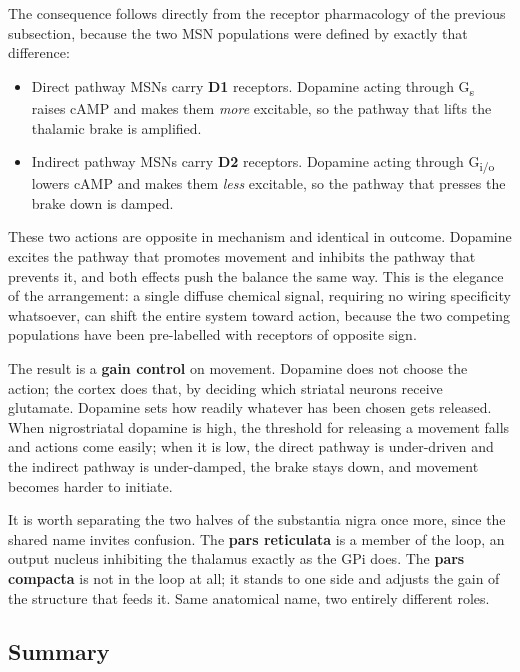 \documentclass[11pt]{article}
\begin{document}
The consequence follows directly from the receptor pharmacology of the previous subsection, because the two MSN populations were defined by exactly that difference:

\begin{itemize}
    \item Direct pathway MSNs carry \textbf{D1} receptors. Dopamine acting through G\textsubscript{s} raises cAMP and makes them \textit{more} excitable, so the pathway that lifts the thalamic brake is amplified.
    \item Indirect pathway MSNs carry \textbf{D2} receptors. Dopamine acting through G\textsubscript{i/o} lowers cAMP and makes them \textit{less} excitable, so the pathway that presses the brake down is damped.
\end{itemize}

These two actions are opposite in mechanism and identical in outcome. Dopamine excites the pathway that promotes movement and inhibits the pathway that prevents it, and both effects push the balance the same way. This is the elegance of the arrangement: a single diffuse chemical signal, requiring no wiring specificity whatsoever, can shift the entire system toward action, because the two competing populations have been pre-labelled with receptors of opposite sign.

The result is a \textbf{gain control} on movement. Dopamine does not choose the action; the cortex does that, by deciding which striatal neurons receive glutamate. Dopamine sets how readily whatever has been chosen gets released. When nigrostriatal dopamine is high, the threshold for releasing a movement falls and actions come easily; when it is low, the direct pathway is under-driven and the indirect pathway is under-damped, the brake stays down, and movement becomes harder to initiate.

It is worth separating the two halves of the substantia nigra once more, since the shared name invites confusion. The \textbf{pars reticulata} is a member of the loop, an output nucleus inhibiting the thalamus exactly as the GPi does. The \textbf{pars compacta} is not in the loop at all; it stands to one side and adjusts the gain of the structure that feeds it. Same anatomical name, two entirely different roles.

\subsection{Summary}
\end{document}
